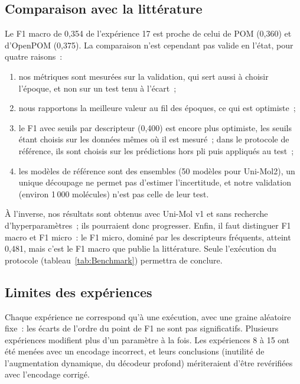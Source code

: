 \subsection{Comparaison avec la littérature}

Le F1 macro de 0,354 de l'expérience 17 est proche de celui de POM (0,360) et d'OpenPOM (0,375).
La comparaison n'est cependant pas valide en l'état, pour quatre raisons~:
\begin{enumerate}
   \item nos métriques sont mesurées sur la validation, qui sert aussi à choisir l'époque, et non sur un test tenu à l'écart~;
   \item nous rapportons la meilleure valeur au fil des époques, ce qui est optimiste~;
   \item le F1 avec seuils par descripteur (0,400) est encore plus optimiste, les seuils étant choisis sur les données mêmes où il est mesuré~; dans le protocole de référence, ils sont choisis sur les prédictions hors pli puis appliqués au test~;
   \item les modèles de référence sont des ensembles (50 modèles pour Uni-Mol2), un unique découpage ne permet pas d'estimer l'incertitude, et notre validation (environ 1\,000 molécules) n'est pas celle de leur test.
\end{enumerate}

À l'inverse, nos résultats sont obtenus avec Uni-Mol v1 et sans recherche d'hyperparamètres~; ils pourraient donc progresser.
Enfin, il faut distinguer F1 macro et F1 micro~: le F1 micro, dominé par les descripteurs fréquents, atteint 0,481, mais c'est le F1 macro que publie la littérature.
Seule l'exécution du protocole (tableau~\ref{tab:Benchmark}) permettra de conclure.

\subsection{Limites des expériences}

Chaque expérience ne correspond qu'à une exécution, avec une graine aléatoire fixe~: les écarts de l'ordre du point de F1 ne sont pas significatifs.
Plusieurs expériences modifient plus d'un paramètre à la fois.
Les expériences 8 à 15 ont été menées avec un encodage incorrect, et leurs conclusions (inutilité de l'augmentation dynamique, du décodeur profond) mériteraient d'être revérifiées avec l'encodage corrigé.


